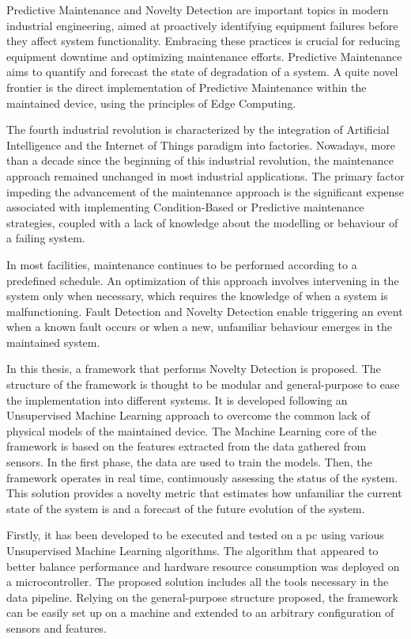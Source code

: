 Predictive Maintenance and Novelty Detection are important topics in modern industrial engineering, aimed at proactively identifying equipment failures before they affect system functionality. Embracing these practices is crucial for reducing equipment downtime and optimizing maintenance efforts. Predictive Maintenance aims to quantify and forecast the state of degradation of a system. A quite novel frontier is the direct implementation of Predictive Maintenance within the maintained device, using the principles of Edge Computing.

The fourth industrial revolution is characterized by the integration of Artificial Intelligence and the Internet of Things paradigm into factories. Nowadays, more than a decade since the beginning of this industrial revolution, the maintenance approach remained unchanged in most industrial applications. The primary factor impeding the advancement of the maintenance approach is the significant expense associated with implementing Condition-Based or Predictive maintenance strategies, coupled with a lack of knowledge about the modelling or behaviour of a failing system.

In most facilities, maintenance continues to be performed according to a predefined schedule. An optimization of this approach involves intervening in the system only when necessary, which requires the knowledge of when a system is malfunctioning. Fault Detection and Novelty Detection enable triggering an event when a known fault occurs or when a new, unfamiliar behaviour emerges in the maintained system. 

In this thesis, a framework that performs Novelty Detection is proposed. The structure of the framework is thought to be modular and general-purpose to ease the implementation into different systems. It is developed following an Unsupervised Machine Learning approach to overcome the common lack of physical models of the maintained device. The Machine Learning core of the framework is based on the features extracted from the data gathered from sensors. In the first phase, the data are used to train the models. Then, the framework operates in real time, continuously assessing the status of the system. This solution provides a novelty metric that estimates how unfamiliar the current state of the system is and a forecast of the future evolution of the system.

Firstly, it has been developed to be executed and tested on a \gls{pc} using various Unsupervised Machine Learning algorithms. The algorithm that appeared to better balance performance and hardware resource consumption was deployed on a microcontroller. The proposed solution includes all the tools necessary in the data pipeline. Relying on the general-purpose structure proposed, the framework can be easily set up on a machine and extended to an arbitrary configuration of sensors and features. 

